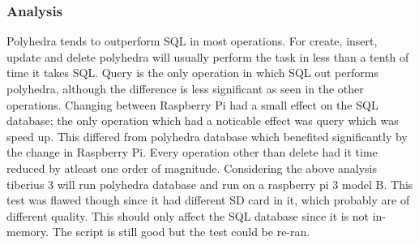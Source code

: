 \subsubsection{Analysis}
Polyhedra tends to outperform SQL in most operations. For create, insert, update and delete polyhedra will usually perform the task in less than a tenth of time it takes SQL. Query is the only operation in which SQL out performs polyhedra, although the difference is less significant as seen in the other operations.
\newline
Changing between Raspberry Pi had a small effect on the SQL database; the only operation which had a noticable effect was query which was speed up. This differed from polyhedra database which benefited significantly by the change in Raspberry Pi. Every operation other than delete had it time reduced by atleast one order of magnitude.
\newline
Considering the above analysis tiberius 3 will run polyhedra database and run on a raspberry pi 3 model B. 
\newline
This test was flawed though since it had different SD card in it, which probably are of different quality. This should only affect the SQL database since it is not in-memory. The script is still good but the test could be re-ran.



















